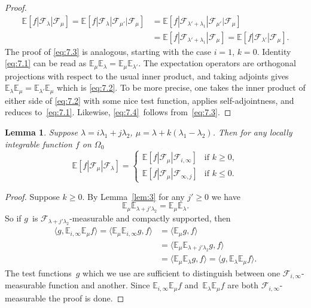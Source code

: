\documentclass[a4paper]{amsart}
\newcommand{\sprod}[2]{{\langle #1, #2\rangle}}
\newcommand{\EE}{\mathbb{E}}
\theoremstyle{plain}
\newtheorem{lemma}[proposition]{Lemma}
\theoremstyle{definition}
\theoremstyle{remark}
\numberwithin{equation}{section}
\theoremstyle{plain}
\begin{document}
\begin{proof}
  \begin{align*}
    \EE[f | \mathcal{F}_\lambda | \mathcal{F}_\mu] 
    =\EE[f | \mathcal{F}_\lambda | \mathcal{F}_{\mu'} 
    	| \mathcal{F}_\mu]
    & =\EE[f | \mathcal{F}_{\lambda' + \lambda_1} | \mathcal{F}_{\mu'}|\mathcal{F}_\mu] \\
    & =\EE[f | \mathcal{F}_{\lambda' + \lambda_1} | \mathcal{F}_\mu]
    =\EE[f | \mathcal{F}_{\lambda'} | \mathcal{F}_\mu].
  \end{align*}
  The proof of \eqref{eq:7.3} is analogous, starting with the case
  $i=1$, $k=0$. Identity \eqref{eq:7.1} can be read as $\EE_\mu
  \EE_\lambda = \EE_\mu \EE_{\lambda'}$. The expectation operators are
  orthogonal projections with respect to the usual inner product, and
  taking adjoints gives $\EE_\lambda \EE_\mu = \EE_{\lambda'} \EE_\mu$
  which is \eqref{eq:7.2}.  To be more precise, one takes the inner
  product of either side of \eqref{eq:7.2} with some nice test
  function, applies self-adjointness, and reduces to~\eqref{eq:7.1}.
  Likewise, \eqref{eq:7.4}~follows from~\eqref{eq:7.3}.
\end{proof}

\begin{lemma}
\label{lem:5}
  Suppose $\lambda = i \lambda_1 + j \lambda_2$, $\mu = \lambda +
  k(\lambda_1 - \lambda_2)$.  Then for any locally integrable
  function $f$ on $\Omega_0$
  \begin{equation*}
    \EE[f | \mathcal{F}_\mu | \mathcal{F}_\lambda]
    =
    \begin{cases}
      \EE[f | \mathcal{F}_\mu | \mathcal{F}_{i,\infty}] &
      \text{if } k \geq 0,\\ 
      \EE[f | \mathcal{F}_\mu | \mathcal{F}_{\infty,j}] &
      \text{if } k \leq 0 
      .
    \end{cases}
  \end{equation*}
\end{lemma}
\begin{proof}
Suppose $k \geq 0$. By Lemma~\ref{lem:3} for any $j' \geq 0$ we have
\begin{equation*}
  \EE_\mu\EE_{\lambda + j' \lambda_2} =  \EE_\mu\EE_\lambda
  .
\end{equation*}
So if $g$~is $\mathcal{F}_{\lambda + j' \lambda_2}$-measurable and compactly
supported, then
\begin{equation}
  \label{eq:51}
  \begin{aligned}
  \nonumber
  \sprod{g}{\EE_{i,\infty}\EE_\mu f}
  =\sprod{\EE_\mu\EE_{i,\infty} g}{f} 
  & =\sprod{\EE_\mu g}{f} \\
  & =\sprod{\EE_\mu\EE_{\lambda+j'\lambda_2} g}{f} \\
  & =\sprod{\EE_\mu\EE_\lambda g}{f}
  =\sprod{g}{\EE_\lambda\EE_\mu f}.
  \end{aligned}
\end{equation}
The test functions~$g$ which we use are sufficient to distinguish
between one $\mathcal{F}_{i,\infty}$-measurable function and another.
Since $\EE_{i,\infty}\EE_\mu f$ and~$\EE_\lambda\EE_\mu f$ are both
$\mathcal{F}_{i,\infty}$-measurable the proof is done.
\end{proof}
\end{document}
